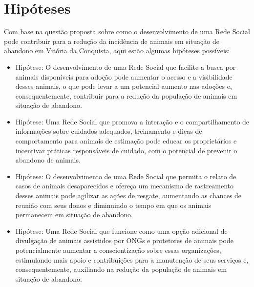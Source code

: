 \section{Hipóteses}
Com base na questão proposta sobre como o desenvolvimento de uma  Rede Social pode contribuir para a redução da incidência de animais em situação de abandono em Vitória da Conquista, aqui estão algumas hipóteses possíveis:
\begin{itemize}
\item Hipótese: O desenvolvimento de uma Rede Social que facilite a busca por animais disponíveis para adoção pode aumentar o acesso e a visibilidade desses animais, o que pode levar a um potencial aumento nas adoções e, consequentemente, contribuir para a redução da população de animais em situação de abandono.

\item Hipótese: Uma Rede Social que promova a interação e o compartilhamento de informações sobre cuidados adequados, treinamento e dicas de comportamento para animais de estimação pode educar os proprietários e incentivar práticas responsáveis de cuidado, com o potencial de prevenir o abandono de animais.
\newpage
\item Hipótese: O desenvolvimento de uma Rede Social que permita o relato de casos de animais desaparecidos e ofereça um mecanismo de rastreamento desses animais pode agilizar as ações de resgate, aumentando as chances de reunião com seus donos e diminuindo o tempo em que os animais permanecem em situação de abandono.

\item Hipótese: Uma Rede Social que funcione como uma opção adicional de divulgação de animais assistidos por ONGs e protetores de animais pode potencialmente aumentar a conscientização sobre essas organizações, estimulando mais apoio e contribuições para a manutenção de seus serviços e, consequentemente, auxiliando na redução da população de animais em situação de abandono.
    
\end{itemize}


